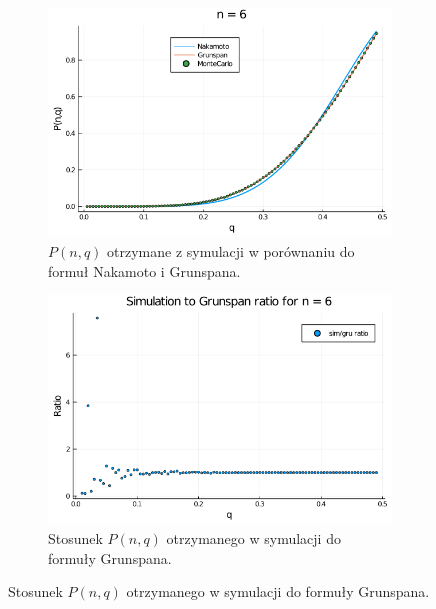 \documentclass{article}
\begin{document}
        \begin{figure}[H]
            \centering
            \begin{subfigure}{0.65\textwidth}
                \includegraphics[width=\linewidth]{img/mc_n=6.png}
                \caption{$P(n,q)$ otrzymane z symulacji w porównaniu do formuł Nakamoto i Grunspana.}
            \end{subfigure}
    
            \begin{subfigure}{0.65\textwidth}
                \includegraphics[width=\linewidth]{img/mc_to_gr_n=6.png}
                \caption{Stosunek $P(n,q)$ otrzymanego w symulacji do formuły Grunspana.}
            \end{subfigure}
    

\end{figure}
\end{document}
